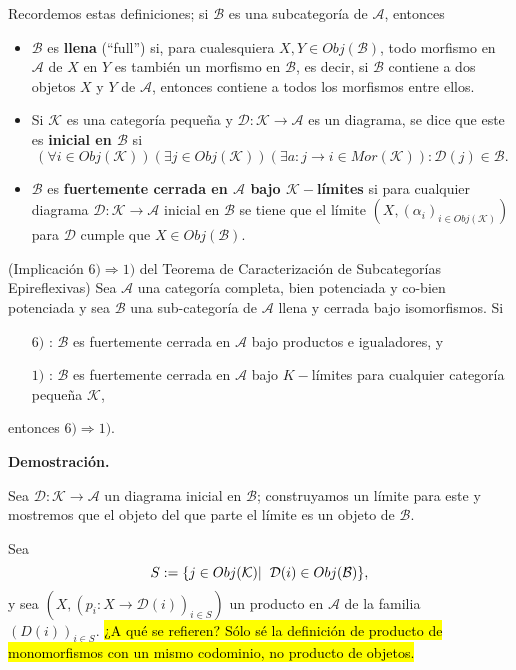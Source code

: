\documentclass[10pt]{article}
\newtheorem[M]{teo}{Teorema}[section]
\newtheorem[M]{listaObj}[teo]{Lista de deseos}
\newtheorem[M]{preg}[teo]{Pregunta}
\newtheorem[M]{lema}[teo]{Lema}
\newtheorem[M]{hip}[teo]{Hipótesis}
\newtheorem[M]{prop}[teo]{Proposición}
\newtheorem[M]{obs}[teo]{Observación}
\newtheorem[M]{cor}[teo]{Corolario}
\newtheorem[M]{defi}[teo]{Definición}
\newtheorem[M]{notacion}[teo]{Notación}
\newtheorem[M]{nota}[teo]{Nota}
\begin{document}
Recordemos estas definiciones;
si $\mathcal{B}$ es una
subcategoría de $\mathcal{A}$, entonces
\begin{itemize}
	\item $\mathcal{B}$ es \textbf{llena} (``full'') si, para cualesquiera
	$X, Y \in Obj(\mathcal{B})$, todo morfismo en 
	$\mathcal{A}$ de $X$ en $Y$ es también un morfismo en 
	$\mathcal{B}$, es decir, si $\mathcal{B}$ contiene a dos objetos
	$X$ y $Y$ de $\mathcal{A}$, entonces contiene a todos los morfismos
	entre ellos.
	\item Si $\mathcal{K}$ es una categoría pequeña y 
	$\mathcal{D}: \mathcal{K} \longrightarrow \mathcal{A}$ es un diagrama,
	se dice que este es \textbf{inicial en $\mathcal{B}$} si
	\[
	(\forall i \in Obj(\mathcal{K}))
	(\exists j \in Obj(\mathcal{K}))
	(\exists a: j \longrightarrow i \in Mor(\mathcal{K})):
	\mathcal{D}(j) \in \mathcal{B}.
	\]
	\item $\mathcal{B}$ es \textbf{fuertemente cerrada en 
	$\mathcal{A}$ bajo $\mathcal{K}-$límites} si 
	para cualquier diagrama 
	$\mathcal{D}: \mathcal{K} \longrightarrow \mathcal{A}$	
	inicial en $\mathcal{B}$ se tiene que el límite 
	$(X, (\alpha_{i})_{i \in Obj(\mathcal{K})})$ para 
	$\mathcal{D}$ cumple que $X \in Obj(\mathcal{B})$.
\end{itemize}

\begin{teo}
(Implicación $6) \Rightarrow 1)$ del Teorema de Caracterización de
Subcategorías Epireflexivas) Sea $\mathcal{A}$ una categoría 
completa, bien potenciada y co-bien potenciada y sea 
$\mathcal{B}$ una sub-categoría de $\mathcal{A}$
llena y cerrada bajo isomorfismos. Si
\begin{itemize}
	\item[$6)$]: $\mathcal{B}$ es fuertemente cerrada en 
	$\mathcal{A}$ bajo productos e igualadores, y
	\item[$1)$]: $\mathcal{B}$ es fuertemente cerrada en $\mathcal{A}$
	bajo $K-$límites para cualquier categoría pequeña $\mathcal{K}$,
\end{itemize}
entonces $6) \Rightarrow 1)$.
\end{teo}
\noindent
\textbf{Demostración.}

Sea $\mathcal{D}: \mathcal{K} \longrightarrow \mathcal{A}$
un diagrama inicial en $\mathcal{B}$; construyamos un límite para 
este y mostremos que el objeto del que parte el límite es 
un objeto de $\mathcal{B}$.

Sea 
\[
S := \{ j \in Obj(\mathcal{K}) | \hspace{0.2cm} 
\mathcal{D}(i) \in Obj(\mathcal{B}) \},
\]
y sea $(X, (p_{i}: X \longrightarrow \mathcal{D}(i))_{i \in S})$
un producto en $\mathcal{A}$ de la familia $(D(i))_{i \in S}$.
\hl{¿A qué se refieren? Sólo sé la definición de producto de monomorfismos
con un mismo codominio, no producto de objetos.}
\end{document}
